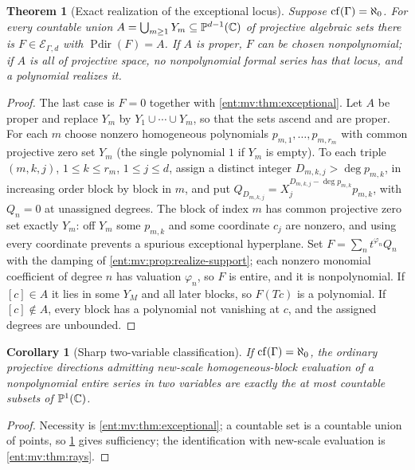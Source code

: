 \documentclass[11pt]{article}
\newtheorem{theorem}{Theorem}[section]
\theoremstyle{plain}
\theoremstyle{plain}
\theoremstyle{plain}
\newtheorem{corollary}[corollary]{Corollary}
\theoremstyle{definition}
\theoremstyle{definition}
\theoremstyle{definition}
\theoremstyle{definition}
\theoremstyle{remark}
\newcommand{\C}{\mathbb C}\newcommand{\R}{\mathbb R}
\DeclareMathOperator{\Pdir}{Pdir}\DeclareMathOperator{\Adm}{Adm}
\begin{document}
\begin{theorem}[Exact realization of the exceptional locus]
\label{ent:mv:thm:realization}
Suppose $\operatorname{cf}(\Gamma)=\aleph_0$. For every countable union
$A=\bigcup_{m\ge1}Y_m\subseteq\PP^{d-1}(\C)$ of projective algebraic sets
there is $F\in\mathcal E_{\Gamma,d}$ with $\Pdir(F)=A$. If $A$ is proper, $F$
can be chosen nonpolynomial; if $A$ is all of projective space, no
nonpolynomial formal series has that locus, and a polynomial realizes it.
\end{theorem}
\begin{proof}
The last case is $F=0$ together with \cref{ent:mv:thm:exceptional}. Let $A$ be
proper and replace $Y_m$ by $Y_1\cup\cdots\cup Y_m$, so that the sets ascend
and are proper. For each $m$ choose nonzero homogeneous polynomials
$p_{m,1},\ldots,p_{m,r_m}$ with common projective zero set $Y_m$ (the single
polynomial $1$ if $Y_m$ is empty). To each triple $(m,k,j)$, $1\le k\le r_m$,
$1\le j\le d$, assign a distinct integer $D_{m,k,j}>\deg p_{m,k}$, in
increasing order block by block in $m$, and put
$Q_{D_{m,k,j}}=X_j^{D_{m,k,j}-\deg p_{m,k}}p_{m,k}$, with $Q_n=0$ at unassigned
degrees. The block of index $m$ has common projective zero set exactly $Y_m$:
off $Y_m$ some $p_{m,k}$ and some coordinate $c_j$ are nonzero, and using every
coordinate prevents a spurious exceptional hyperplane. Set
$F=\sum_nt^{\varphi_n}Q_n$ with the damping of
\cref{ent:mv:prop:realize-support}; each nonzero monomial coefficient of
degree $n$ has valuation $\varphi_n$, so $F$ is entire, and it is
nonpolynomial. If $[c]\in A$ it lies in some $Y_M$ and all later blocks, so
$F(Tc)$ is a polynomial. If $[c]\notin A$, every block has a polynomial not
vanishing at $c$, and the assigned degrees are unbounded.
\end{proof}

\begin{corollary}[Sharp two-variable classification]\label{ent:mv:cor:countable}
If $\operatorname{cf}(\Gamma)=\aleph_0$, the ordinary projective directions admitting
new-scale homogeneous-block evaluation of a nonpolynomial entire series in two
variables are exactly the at most countable subsets of $\PP^1(\C)$.
\end{corollary}
\begin{proof}
Necessity is \cref{ent:mv:thm:exceptional}; a countable set is a countable
union of points, so \cref{ent:mv:thm:realization} gives sufficiency; the
identification with new-scale evaluation is \cref{ent:mv:thm:rays}.
\end{proof}
\end{document}

